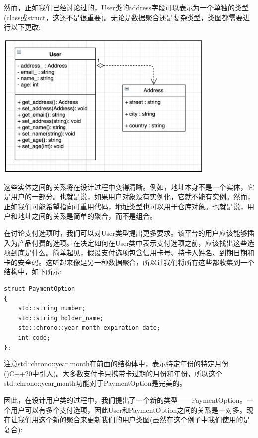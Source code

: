 然而，正如我们已经讨论过的，User类的address字段可以表示为一个单独的类型(class或struct，这还不是很重要)。无论是数据聚合还是复杂类型，类图都需要进行以下更改: \par

\begin{center}
	\includegraphics[width=0.8\textwidth]{content/Section-2/Chapter-10/6}
\end{center}

这些实体之间的关系将在设计过程中变得清晰。例如，地址本身不是一个实体，它是用户的一部分。也就是说，如果用户对象没有实例化，它就不能有实例。然而，正如我们可能希望指向可重用代码，地址类型也可以用于仓库对象。也就是说，用户和地址之间的关系是简单的聚合，而不是组合。 \par
在讨论支付选项时，我们可以对User类型提出更多要求。该平台的用户应该能够插入为产品付费的选项。在决定如何在User类中表示支付选项之前，应该找出这些选项到底是什么。简单起见，假设支付选项包含信用卡号、持卡人姓名、到期日期和卡的安全码。这听起来像是另一种数据聚合，所以让我们将所有这些都收集到一个结构中，如下所示: \par

\begin{lstlisting}[caption={}]
struct PaymentOption
{
	std::string number;
	std::string holder_name;
	std::chrono::year_month expiration_date;
	int code;
};
\end{lstlisting}

注意std::chrono::year\underline{ }month在前面的结构体中，表示特定年份的特定月份()C++20中引入)。大多数支付卡只携带卡过期的月份和年份，所以这个std::chrono::year\underline{ }month功能对于PaymentOption是完美的。 \par
因此，在设计用户类的过程中，我们提出了一个新的类型——PaymentOption。一个用户可以有多个支付选项，因此User和PaymentOption之间的关系是一对多。现在让我们用这个新的聚合来更新我们的用户类图(虽然在这个例子中我们使用的是复合): \par

